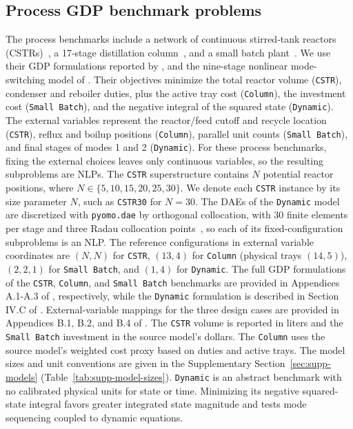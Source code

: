 \documentclass{article}
\begin{document}
\subsection{Process GDP benchmark problems}
\label{sec:process-cases}
The process benchmarks include a network of continuous stirred-tank reactors (CSTRs)~\citep{linan2020optimal}, a 17-stage distillation column~\citep{ghouse2018comparative}, and a small batch plant~\citep{kocis1988global}.
We use their GDP formulations reported by \citet{ovalle2025logic}, and the nine-stage nonlinear mode-switching model of \citet{peng2024dynamic}.
Their objectives minimize the total reactor volume (\texttt{CSTR}), condenser and reboiler duties, plus the active tray cost (\texttt{Column}), the investment cost (\texttt{Small Batch}), and the negative integral of the squared state (\texttt{Dynamic}).
The external variables represent the reactor/feed cutoff and recycle location (\texttt{CSTR}), reflux and boilup positions (\texttt{Column}), parallel unit counts (\texttt{Small Batch}), and final stages of modes 1 and 2 (\texttt{Dynamic}).
For these process benchmarks, fixing the external choices leaves only continuous variables, so the resulting subproblems are NLPs.
The \texttt{CSTR} superstructure contains \(N\) potential reactor positions, where \(N\in\{5,10,15,20,25,30\}\).
We denote each \texttt{CSTR} instance by its size parameter \(N\), such as \texttt{CSTR30} for \(N=30\).
The DAEs of the \texttt{Dynamic} model are discretized with \texttt{pyomo.dae} by orthogonal collocation, with 30 finite elements per stage and three Radau collocation points~\citep{nicholson2018pyomo}, so each of its fixed-configuration subproblems is an NLP.
The reference configurations in external variable coordinates are \((N,N)\) for \texttt{CSTR}, \((13,4)\) for \texttt{Column} (physical trays \((14,5)\)), \((2,2,1)\) for \texttt{Small Batch}, and \((1,4)\) for \texttt{Dynamic}.
The full GDP formulations of the \texttt{CSTR}, \texttt{Column}, and \texttt{Small Batch} benchmarks are provided in Appendices A.1-A.3 of \citet{ovalle2025logic}, respectively, while the \texttt{Dynamic} formulation is described in Section IV.C of \citet{peng2024dynamic}.
External-variable mappings for the three design cases are provided in Appendices B.1, B.2, and B.4 of \citet{ovalle2025logic}.
The \texttt{CSTR} volume is reported in liters and the \texttt{Small Batch} investment in the source model's dollars.
The \texttt{Column} uses the source model's weighted cost proxy based on duties and active trays.
The model sizes and unit conventions are given in the Supplementary Section~\ref{sec:supp-models} (Table~\ref{tab:supp-model-sizes}).
\texttt{Dynamic} is an abstract benchmark with no calibrated physical units for state or time.
Minimizing its negative squared-state integral favors greater integrated state magnitude and tests mode sequencing coupled to dynamic equations.
\end{document}
